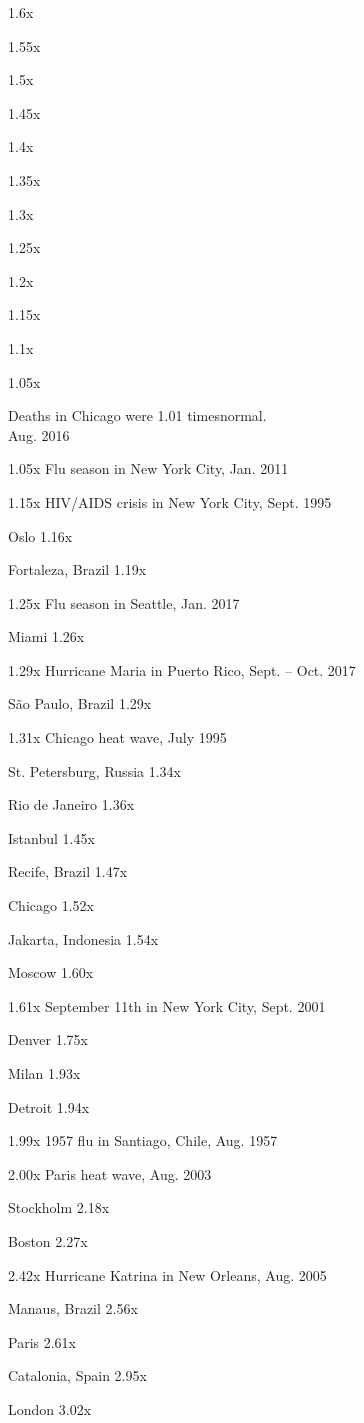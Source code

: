 1.6x

1.55x

1.5x

1.45x

1.4x

1.35x

1.3x

1.25x

1.2x

1.15x

1.1x

1.05x

Deaths in Chicago were 1.01 timesnormal.\\
Aug. 2016

1.05x Flu season in New York City, Jan. 2011

1.15x HIV/AIDS crisis in New York City, Sept. 1995

Oslo 1.16x

Fortaleza, Brazil 1.19x

1.25x Flu season in Seattle, Jan. 2017

Miami 1.26x

1.29x Hurricane Maria in Puerto Rico, Sept. -- Oct. 2017

São Paulo, Brazil 1.29x

1.31x Chicago heat wave, July 1995

St. Petersburg, Russia 1.34x

Rio de Janeiro 1.36x

Istanbul 1.45x

Recife, Brazil 1.47x

Chicago 1.52x

Jakarta, Indonesia 1.54x

Moscow 1.60x

1.61x September 11th in New York City, Sept. 2001

Denver 1.75x

Milan 1.93x

Detroit 1.94x

1.99x 1957 flu in Santiago, Chile, Aug. 1957

2.00x Paris heat wave, Aug. 2003

Stockholm 2.18x

Boston 2.27x

2.42x Hurricane Katrina in New Orleans, Aug. 2005

Manaus, Brazil 2.56x

Paris 2.61x

Catalonia, Spain 2.95x

London 3.02x

